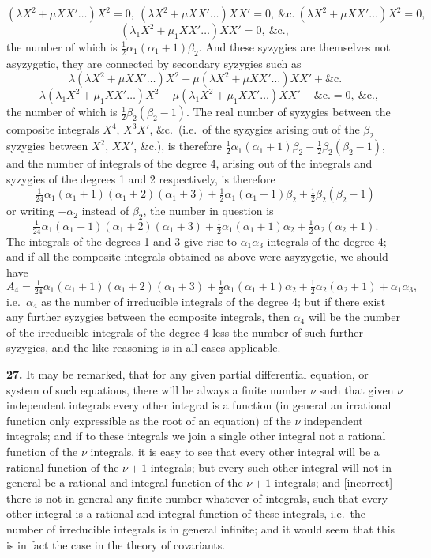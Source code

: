 \documentclass[11pt]{article}
\begin{document}
\[
(\lambda X^2 + \mu XX' \ldots)X^2 = 0,\ (\lambda X^2 + \mu XX' \ldots)XX' = 0,\ \&\text{c.}\ (\lambda X^2 + \mu XX' \ldots)X^2 = 0,
\]
\[
(\lambda_1 X^2 + \mu_1 XX' \ldots) XX' = 0,\ \&\text{c.},
\]
the number of which is $\tfrac{1}{2}\alpha_1(\alpha_1 + 1)\beta_2$. And these syzygies are themselves not asyzygetic, they are connected by secondary syzygies such as
\[
\lambda(\lambda X^2 + \mu XX' \ldots)X^2 + \mu(\lambda X^2 + \mu XX' \ldots)XX' + \&\text{c.}
\]
\[
- \lambda(\lambda_1 X^2 + \mu_1 XX' \ldots)X^2 - \mu(\lambda_1 X^2 + \mu_1 XX' \ldots)XX' - \&\text{c.} = 0,\ \&\text{c.},
\]
the number of which is $\tfrac{1}{2}\beta_2(\beta_2 - 1)$. The real number of syzygies between the composite integrals $X^4$, $X^3 X'$, \&c.\ (i.e.\ of the syzygies arising out of the $\beta_2$ syzygies between $X^2$, $XX'$, \&c.), is therefore $\tfrac{1}{2}\alpha_1(\alpha_1 + 1)\beta_2 - \tfrac{1}{2}\beta_2(\beta_2 - 1)$, and the number of integrals of the degree 4, arising out of the integrals and syzygies of the degrees 1 and 2 respectively, is therefore
\[
\tfrac{1}{24}\alpha_1(\alpha_1 + 1)(\alpha_1 + 2)(\alpha_1 + 3) + \tfrac{1}{2}\alpha_1(\alpha_1 + 1)\beta_2 + \tfrac{1}{2}\beta_2(\beta_2 - 1)
\]
or writing $-\alpha_2$ instead of $\beta_2$, the number in question is
\[
\tfrac{1}{24}\alpha_1(\alpha_1 + 1)(\alpha_1 + 2)(\alpha_1 + 3) + \tfrac{1}{2}\alpha_1(\alpha_1 + 1)\alpha_2 + \tfrac{1}{2}\alpha_2(\alpha_2 + 1).
\]
The integrals of the degrees 1 and 3 give rise to $\alpha_1\alpha_3$ integrals of the degree 4; and if all the composite integrals obtained as above were asyzygetic, we should have
\[
A_4 = \tfrac{1}{24}\alpha_1(\alpha_1+1)(\alpha_1+2)(\alpha_1+3) + \tfrac{1}{2}\alpha_1(\alpha_1+1)\alpha_2 + \tfrac{1}{2}\alpha_2(\alpha_2+1) + \alpha_1\alpha_3,
\]
i.e.\ $\alpha_4$ as the number of irreducible integrals of the degree 4; but if there exist any further syzygies between the composite integrals, then $\alpha_4$ will be the number of the irreducible integrals of the degree 4 less the number of such further syzygies, and the like reasoning is in all cases applicable.

\textbf{27.} It may be remarked, that for any given partial differential equation, or system of such equations, there will be always a finite number $\nu$ such that given $\nu$ independent integrals every other integral is a function (in general an irrational function only expressible as the root of an equation) of the $\nu$ independent integrals; and if to these integrals we join a single other integral not a rational function of the $\nu$ integrals, it is easy to see that every other integral will be a rational function of the $\nu+1$ integrals; but every such other integral will not in general be a rational and integral function of the $\nu+1$ integrals; and [incorrect] there is not in general any finite number whatever of integrals, such that every other integral is a rational and integral function of these integrals, i.e.\ the number of irreducible integrals is in general infinite; and it would seem that this is in fact the case in the theory of covariants.
\end{document}
